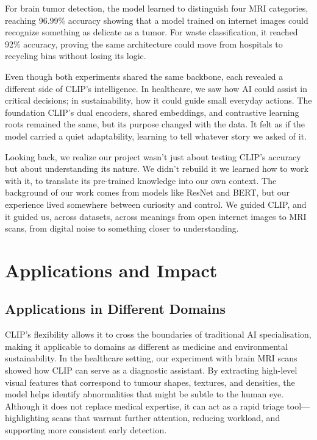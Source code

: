 \documentclass[12pt]{article}
\begin{document}
For brain tumor detection, the model learned to distinguish four MRI categories, reaching 96.99\% accuracy showing that a model trained on internet images could recognize something as delicate as a tumor. For waste classification, it reached 92\% accuracy, proving the same architecture could move from hospitals to recycling bins without losing its logic.

Even though both experiments shared the same backbone, each revealed a different side of CLIP’s intelligence. In healthcare, we saw how AI could assist in critical decisions; in sustainability, how it could guide small everyday actions. The foundation CLIP’s dual encoders, shared embeddings, and contrastive learning roots remained the same, but its purpose changed with the data. It felt as if the model carried a quiet adaptability, learning to tell whatever story we asked of it.

Looking back, we realize our project wasn’t just about testing CLIP’s accuracy but about understanding its nature. We didn’t rebuild it we learned how to work with it, to translate its pre-trained knowledge into our own context. The background of our work comes from models like ResNet and BERT, but our experience lived somewhere between curiosity and control. We guided CLIP, and it guided us, across datasets, across meanings from open internet images to MRI scans, from digital noise to something closer to understanding.
\newpage

\section{Applications and Impact}

\subsection{Applications in Different Domains}
CLIP’s flexibility allows it to cross the boundaries of traditional AI specialisation, making it applicable to domains as different as medicine and environmental sustainability. In the healthcare setting, our experiment with brain MRI scans showed how CLIP can serve as a diagnostic assistant. By extracting high-level visual features that correspond to tumour shapes, textures, and densities, the model helps identify abnormalities that might be subtle to the human eye. Although it does not replace medical expertise, it can act as a rapid triage tool—highlighting scans that warrant further attention, reducing workload, and supporting more consistent early detection.  
\vspace{0.3em}
\end{document}

